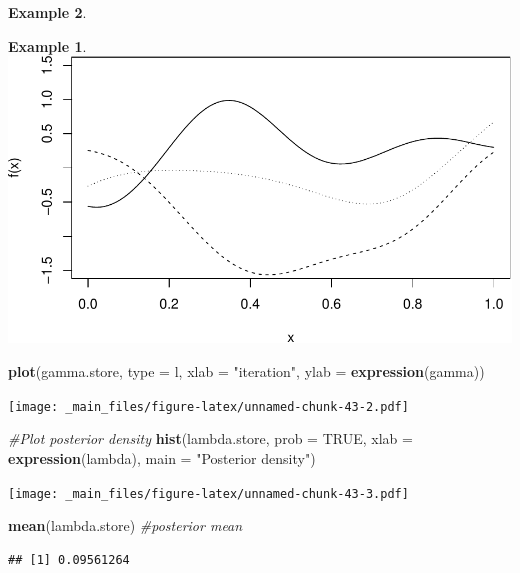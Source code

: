 \documentclass[
]{book}
\newenvironment{Shaded}{\begin{snugshade}}{\end{snugshade}}
\newcommand{\AttributeTok}[1]{\textcolor[rgb]{0.13,0.29,0.53}{#1}}
\newcommand{\CommentTok}[1]{\textcolor[rgb]{0.56,0.35,0.01}{\textit{#1}}}
\newcommand{\ConstantTok}[1]{\textcolor[rgb]{0.56,0.35,0.01}{#1}}
\newcommand{\FunctionTok}[1]{\textcolor[rgb]{0.13,0.29,0.53}{\textbf{#1}}}
\newcommand{\NormalTok}[1]{#1}
\newcommand{\StringTok}[1]{\textcolor[rgb]{0.31,0.60,0.02}{#1}}
\theoremstyle{definition}
\theoremstyle{definition}
\newtheorem{example}{Example}[chapter]
\theoremstyle{definition}
\theoremstyle{definition}
\theoremstyle{remark}
\begin{document}
\begin{example}
\begin{example}
\includegraphics{_main_files/figure-latex/unnamed-chunk-43-1.pdf}

\begin{Shaded}
\begin{Highlighting}[]
\FunctionTok{plot}\NormalTok{(gamma.store, }\AttributeTok{type =} \StringTok{\textquotesingle{}l\textquotesingle{}}\NormalTok{, }\AttributeTok{xlab =} \StringTok{"iteration"}\NormalTok{, }\AttributeTok{ylab =} \FunctionTok{expression}\NormalTok{(gamma))}
\end{Highlighting}
\end{Shaded}

\texttt{[image: \_main\_files/figure-latex/unnamed-chunk-43-2.pdf]}

\begin{Shaded}
\begin{Highlighting}[]
\CommentTok{\#Plot posterior density}
\FunctionTok{hist}\NormalTok{(lambda.store, }\AttributeTok{prob =} \ConstantTok{TRUE}\NormalTok{, }\AttributeTok{xlab =} \FunctionTok{expression}\NormalTok{(lambda), }\AttributeTok{main =} \StringTok{"Posterior density"}\NormalTok{)}
\end{Highlighting}
\end{Shaded}

\texttt{[image: \_main\_files/figure-latex/unnamed-chunk-43-3.pdf]}

\begin{Shaded}
\begin{Highlighting}[]
\FunctionTok{mean}\NormalTok{(lambda.store) }\CommentTok{\#posterior mean}
\end{Highlighting}
\end{Shaded}

\begin{verbatim}
## [1] 0.09561264
\end{verbatim}


\end{example}
\end{example}
\end{document}
